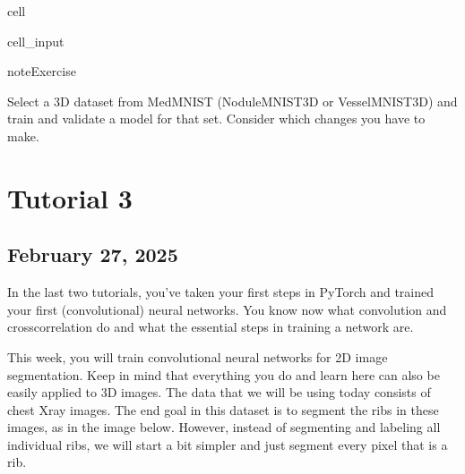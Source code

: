 \documentclass[letterpaper,10pt,english]{jupyterBook}
\begin{document}
\begin{sphinxuseclass}{cell}\begin{sphinxVerbatimInput}

\begin{sphinxuseclass}{cell_input}
\begin{sphinxVerbatim}[commandchars=\\\{\}]
 
\end{sphinxVerbatim}

\end{sphinxuseclass}\end{sphinxVerbatimInput}

\end{sphinxuseclass}
\begin{sphinxadmonition}{note}{Exercise}

\sphinxAtStartPar
Select a 3D dataset from MedMNIST (NoduleMNIST3D or VesselMNIST3D) and train and validate a model for that set. Consider which changes you have to make.
\end{sphinxadmonition}

\sphinxstepscope


\chapter{Tutorial 3}
\label{\detokenize{notebooks/Tutorial3_Segmentation/Tutorial3_Segmentation_student:tutorial-3}}\label{\detokenize{notebooks/Tutorial3_Segmentation/Tutorial3_Segmentation_student::doc}}

\section{February 27, 2025}
\label{\detokenize{notebooks/Tutorial3_Segmentation/Tutorial3_Segmentation_student:february-27-2025}}
\sphinxAtStartPar
In the last two tutorials, you’ve taken your first steps in PyTorch and trained your first (convolutional) neural networks. You know now what convolution and cross\sphinxhyphen{}correlation do and what the essential steps in training a network are.

\sphinxAtStartPar
This week, you will train convolutional neural networks for 2D image segmentation. Keep in mind that everything you do and learn here can also be easily applied to 3D images. The data that we will be using today consists of chest X\sphinxhyphen{}ray images. The end goal in this dataset is to segment the ribs in these images, as in the image below. However, instead of segmenting and labeling all individual ribs, we will start a bit simpler and just segment every pixel that is a rib.
\end{document}

